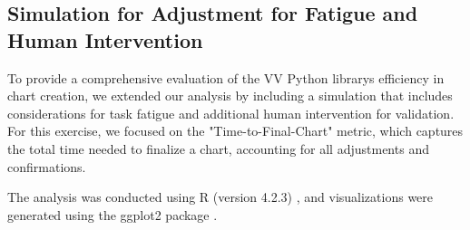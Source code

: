 \subsection{Simulation for Adjustment for Fatigue and Human
Intervention}\label{simulation-for-adjustment-for-fatigue-and-human-intervention}

To provide a comprehensive evaluation of the VV Python
library\textquotesingle s efficiency in chart creation, we extended our
analysis by including a simulation that includes considerations for task
fatigue and additional human intervention for validation. For this
exercise, we focused on the "Time-to-Final-Chart" metric, which captures
the total time needed to finalize a chart, accounting for all
adjustments and confirmations.

The analysis was conducted using R (version 4.2.3)
\cite{41}, and visualizations
were generated using the ggplot2 package
\cite{13}.
